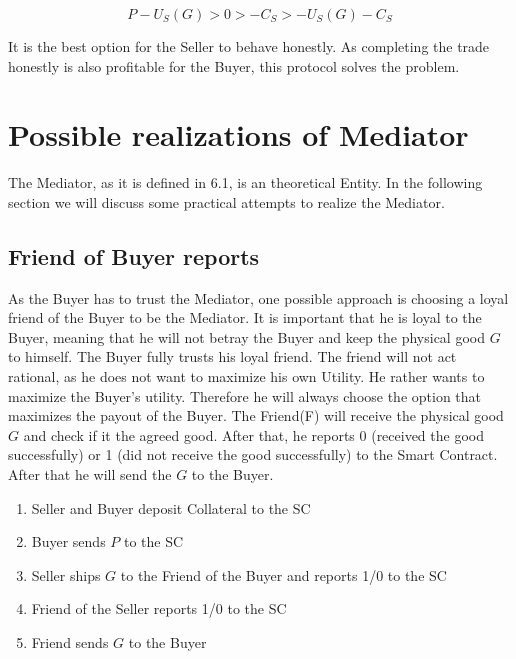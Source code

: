 \documentclass{cacthesis}
\begin{document}
\[P-U_S(G)>0>-C_S>-U_S(G) - C_S\]

It is the best option for the Seller to behave honestly.\newline
As completing the trade honestly is also profitable for the Buyer, this protocol solves the problem.


\section{Possible realizations of Mediator}
The Mediator, as it is defined in 6.1, is an theoretical Entity. In the following section we will discuss some practical attempts to realize the Mediator.
\subsection{Friend of Buyer reports}
As the Buyer has to trust the Mediator, one possible approach is choosing a loyal friend of the Buyer to be the Mediator. It is important that he is loyal to the Buyer, meaning that he will not betray the Buyer and keep the physical good $G$ to himself. The Buyer fully trusts his loyal friend. 
The friend will not act rational, as he does not want to maximize his own Utility. He rather wants to maximize the Buyer's utility. Therefore he will always choose the option that maximizes the payout of the Buyer.\newline
The Friend(F) will receive the physical good $G$ and check if it the agreed good. After that, he reports 0 (received the good successfully) or 1 (did not receive the good successfully) to the Smart Contract. After that he will send the $G$ to the Buyer.

\begin{enumerate}
    \item Seller and Buyer deposit Collateral to the SC
    \item Buyer sends $P$ to the SC
    \item Seller ships $G$ to the Friend of the Buyer and reports 1/0 to the SC
    \item Friend of the Seller reports 1/0 to the SC
    \item Friend sends $G$ to the Buyer
\end{enumerate}
\end{document}
